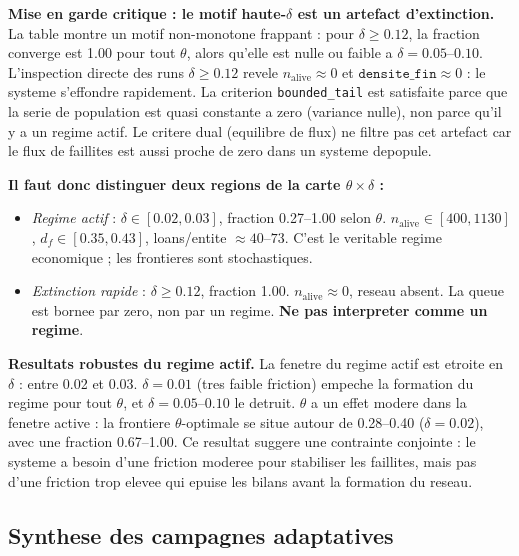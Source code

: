 \documentclass[11pt,a4paper]{article}
\begin{document}
\textbf{Mise en garde critique : le motif haute-\(\delta\) est un artefact d'extinction.}
La table montre un motif non-monotone frappant : pour \(\delta \ge 0.12\),
la fraction converge est 1.00 pour tout \(\theta\), alors qu'elle est nulle ou
faible a \(\delta = 0.05\)--\(0.10\).
L'inspection directe des runs \(\delta \ge 0.12\) revele \(n_{\mathrm{alive}} \approx 0\)
et \(\texttt{densite\_fin} \approx 0\) : le systeme s'effondre rapidement.
La criterion \texttt{bounded\_tail} est satisfaite parce que la serie de population
est quasi constante a zero (variance nulle), non parce qu'il y a un regime actif.
Le critere dual (equilibre de flux) ne filtre pas cet artefact car le flux de faillites
est aussi proche de zero dans un systeme depopule.

\textbf{Il faut donc distinguer deux regions de la carte \(\theta \times \delta\) :}
\begin{itemize}
  \item \emph{Regime actif} : \(\delta \in [0.02, 0.03]\), fraction 0.27--1.00 selon \(\theta\).
    \(n_{\mathrm{alive}} \in [400, 1130]\), \(d_f \in [0.35, 0.43]\),
    loans/entite \(\approx 40\)--\(73\).
    C'est le veritable regime economique ; les frontieres sont stochastiques.
  \item \emph{Extinction rapide} : \(\delta \ge 0.12\), fraction 1.00.
    \(n_{\mathrm{alive}} \approx 0\), reseau absent.
    La queue est bornee par zero, non par un regime.
    \textbf{Ne pas interpreter comme un regime}.
\end{itemize}

\textbf{Resultats robustes du regime actif.}
La fenetre du regime actif est etroite en \(\delta\) : entre 0.02 et 0.03.
\(\delta = 0.01\) (tres faible friction) empeche la formation du regime pour tout \(\theta\),
et \(\delta = 0.05\)--\(0.10\) le detruit.
\(\theta\) a un effet modere dans la fenetre active : la frontiere
\(\theta\)-optimale se situe autour de 0.28--0.40 (\(\delta=0.02\)),
avec une fraction 0.67--1.00.
Ce resultat suggere une contrainte conjointe : le systeme a besoin d'une
friction moderee pour stabiliser les faillites, mais pas d'une friction trop
elevee qui epuise les bilans avant la formation du reseau.

\subsection*{Synthese des campagnes adaptatives}
\end{document}
